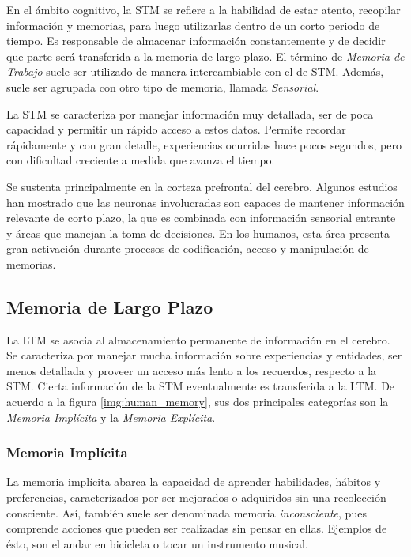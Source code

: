 En el \'ambito cognitivo, la STM se refiere a la habilidad de estar atento, recopilar informaci\'on  y memorias, para luego utilizarlas dentro de un corto periodo de tiempo. Es responsable de almacenar informaci\'on constantemente y de decidir que parte ser\'a transferida a la memoria de largo plazo. El t\'ermino de \textit{Memoria de Trabajo} suele ser utilizado de manera intercambiable con el de STM. Adem\'as, suele ser agrupada con otro tipo de memoria, llamada \textit{Sensorial}.

La STM se caracteriza por manejar informaci\'on muy detallada, ser de poca capacidad y permitir un r\'apido acceso a estos datos. Permite recordar r\'apidamente y con gran detalle, experiencias ocurridas hace pocos segundos, pero con dificultad creciente a medida que avanza el tiempo.

Se sustenta principalmente en la corteza prefrontal del cerebro. Algunos estudios han mostrado que las neuronas involucradas son capaces de mantener informaci\'on relevante de corto plazo, la que es combinada con informaci\'on sensorial entrante y \'areas que manejan la toma de decisiones. %
En los humanos, esta \'area presenta gran activaci\'on durante procesos de codificaci\'on, acceso y manipulaci\'on de memorias. %


\subsection{Memoria de Largo Plazo}

La LTM se asocia al almacenamiento permanente de informaci\'on en el cerebro. Se caracteriza por manejar mucha informaci\'on sobre experiencias y entidades, ser menos detallada y proveer un acceso m\'as lento a los recuerdos, respecto a la STM\cite{Eichenbaum:2008}. Cierta informaci\'on de la STM eventualmente es transferida a la LTM. De acuerdo a la figura \ref{img:human_memory}, sus dos principales categor\'ias son la \textit{Memoria Impl\'icita} y la \textit{Memoria Expl\'icita}.

\subsubsection{Memoria Impl\'icita}

La memoria impl\'icita  abarca la capacidad de aprender habilidades, h\'abitos y preferencias, caracterizados por ser mejorados o adquiridos sin una recolecci\'on consciente. As\'i, tambi\'en suele ser denominada memoria \textit{inconsciente}, pues comprende acciones que pueden ser realizadas sin pensar en ellas. Ejemplos de \'esto, son el andar en bicicleta o tocar un instrumento musical.

